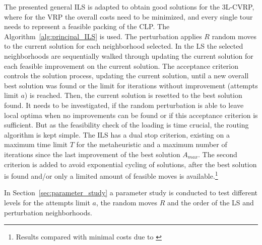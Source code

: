 The presented general \gls{ILS} is adapted to obtain good solutions for the \gls{3L-CVRP}, where for the \gls{VRP}
the overall costs need to be minimized, and every single tour needs to represent a feasible packing of the \gls{CLP}.
The Algorithm~\ref{alg:principal_ILS} is used. The perturbation applies $R$ random moves
to the current solution for each neighborhood selected. In the \gls{LS}
the selected neighborhoods are sequentially walked through updating the current solution for each feasible improvement on
the current solution. The acceptance criterion controls the solution process, updating the current solution, until a new overall
best solution was found or the limit for iterations without improvement (attempts limit $a$) is reached. Then, the current solution is resetted
to the best solution found. It needs to be investigated, if the random perturbation is able to leave local optima
when no improvements can be found or if this acceptance criterion is sufficient. But as the feasibility check of the loading
is time crucial, the routing algorithm is kept simple. The \gls{ILS} has a dual stop criterion, existing on a maximum time limit $T$ for the metaheuristic and a maximum number of
iterations since the last improvement of the best solution $A_{max}$. The second criterion is added
to avoid exponential cycling of solutions, after the best solution is found and/or only a limited amount of feasible moves is available.\footnote{Results compared with
    minimal costs due to \cite{tamke_branch-and-cut_2024}}



In Section~\ref{sec:parameter_study} a parameter study is conducted to test different
levels for the attempts limit $a$, the random moves $R$ and the order of the \gls{LS} and perturbation neighborhoods.

